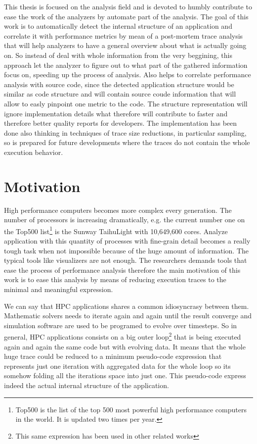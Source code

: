 \documentclass[12pt]{report}
\begin{document}
This thesis is focused on the analysis field and is devoted to humbly contribute 
to ease the work of the analyzers by
automate part of the analysis. The goal of this work is to automatically detect
the internal structure of an application and correlate it with performance metrics by
mean of a post-mortem trace analysis that will help analyzers to have a general
overview about what is actually going on. So instead of deal with whole
information from the very beggining, this approach let the analyzer to figure
out to what part of the gathered information focus on, speeding up the process of
analysis. Also helps to correlate performance analysis with source code, 
since the detected application structure would be similar as
code structure and will contain source coude information that will allow to
easly pinpoint one metric to the code. The structure representation will ignore 
implementation details what therefore will contribute to faster and therefore better 
quality reports for developers. The implementation has been done also thinking 
in techniques of trace size reductions, in particular sampling, so is prepared 
for future developments where the traces do not contain the whole execution behavior.

\section{Motivation}

High performance computers becomes more complex every generation. The number of 
processors is increasing dramatically, e.g. the current number one on the Top500
 list\footnote{Top500 is the list of the top 500 most powerful high performance 
computers in the world. It is updated two times per year.} is the Sunway TaihuLight 
with 10,649,600 cores\cite{top5002017}. Analyze application with this quantity 
of processes with fine-grain detail becomes a really tough task when not
impossible because of the huge amount of information. The typical tools like 
visualizers are not enough. The researchers demands tools that ease the process 
of performance analysis therefore the main motivation of this work is to ease 
this analysis by means of reducing execution traces to the minimal and meaningful 
expression.


We can say that HPC applications shares a common idiosyncrasy between them. 
Mathematic solvers needs to iterate again and again until the result converge and 
simulation software are used to be programed to evolve over timesteps. So in 
general, HPC applications consists on a big outer loop\footnote{This same expression 
has been used in other related works} that is being executed again and again the
same code but with evolving data. It means that the whole huge trace could be 
reduced to a minimum pseudo-code expression that represents just one iteration 
with aggregated data for the whole loop so its somehow folding all the iterations
space into just one. This pseudo-code express indeed the actual internal 
structure of the application.
\end{document}
